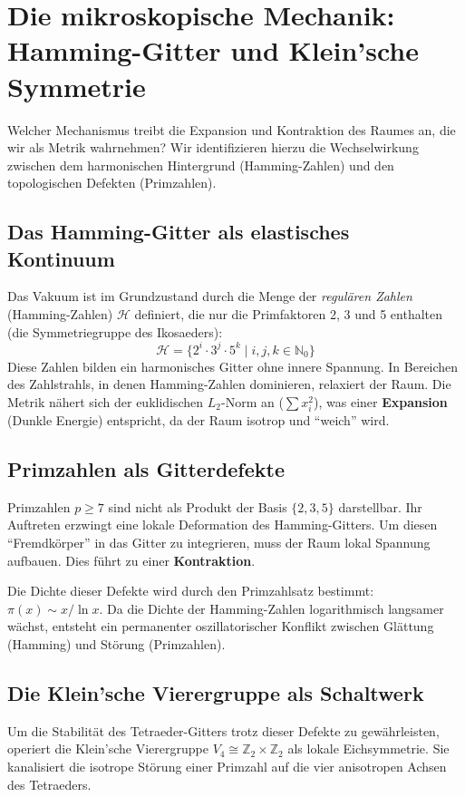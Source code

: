 \documentclass[11pt, a4paper]{article}
\begin{document}
	\section{Die mikroskopische Mechanik: Hamming-Gitter und Klein'sche Symmetrie}
	
	Welcher Mechanismus treibt die Expansion und Kontraktion des Raumes an, die wir als Metrik wahrnehmen? Wir identifizieren hierzu die Wechselwirkung zwischen dem harmonischen Hintergrund (Hamming-Zahlen) und den topologischen Defekten (Primzahlen).
	
	\subsection{Das Hamming-Gitter als elastisches Kontinuum}
	Das Vakuum ist im Grundzustand durch die Menge der \textit{regulären Zahlen} (Hamming-Zahlen) $\mathcal{H}$ definiert, die nur die Primfaktoren 2, 3 und 5 enthalten (die Symmetriegruppe des Ikosaeders):
	\begin{equation}
		\mathcal{H} = \{ 2^i \cdot 3^j \cdot 5^k \mid i,j,k \in \mathbb{N}_0 \}
	\end{equation}
	Diese Zahlen bilden ein harmonisches Gitter ohne innere Spannung. In Bereichen des Zahlstrahls, in denen Hamming-Zahlen dominieren, relaxiert der Raum. Die Metrik nähert sich der euklidischen $L_2$-Norm an ($\sum x_i^2$), was einer \textbf{Expansion} (Dunkle Energie) entspricht, da der Raum isotrop und "`weich"' wird.
	
	\subsection{Primzahlen als Gitterdefekte}
	Primzahlen $p \ge 7$ sind nicht als Produkt der Basis $\{2,3,5\}$ darstellbar. Ihr Auftreten erzwingt eine lokale Deformation des Hamming-Gitters. Um diesen "`Fremdkörper"' in das Gitter zu integrieren, muss der Raum lokal Spannung aufbauen. Dies führt zu einer \textbf{Kontraktion}.
	
	Die Dichte dieser Defekte wird durch den Primzahlsatz bestimmt: $\pi(x) \sim x/\ln x$. Da die Dichte der Hamming-Zahlen logarithmisch langsamer wächst, entsteht ein permanenter oszillatorischer Konflikt zwischen Glättung (Hamming) und Störung (Primzahlen).
	
	\subsection{Die Klein'sche Vierergruppe als Schaltwerk}
	Um die Stabilität des Tetraeder-Gitters trotz dieser Defekte zu gewährleisten, operiert die Klein'sche Vierergruppe $V_4 \cong \mathbb{Z}_2 \times \mathbb{Z}_2$ als lokale Eichsymmetrie. Sie kanalisiert die isotrope Störung einer Primzahl auf die vier anisotropen Achsen des Tetraeders.
	
\end{document}
